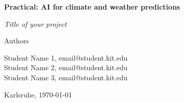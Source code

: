 
\begin{titlepage}
    \centering
    {\LARGE \textbf{Practical: AI for climate and weather predictions}\par}
    \vspace{7cm} %
    {\LARGE \textit{Title of your project}\par}
    \vspace{4cm}    
    {Authors\\}
    {\large {Student Name 1, email@student.kit.edu \\
    Student Name 2, email@student.kit.edu \\
    Student Name 3, email@student.kit.edu}\par}
    \vspace{0.5cm}
    \vspace*{\fill} %
    \vspace{1cm}
    \begin{center}
        Karlsruhe, \today
    \end{center}
\end{titlepage}